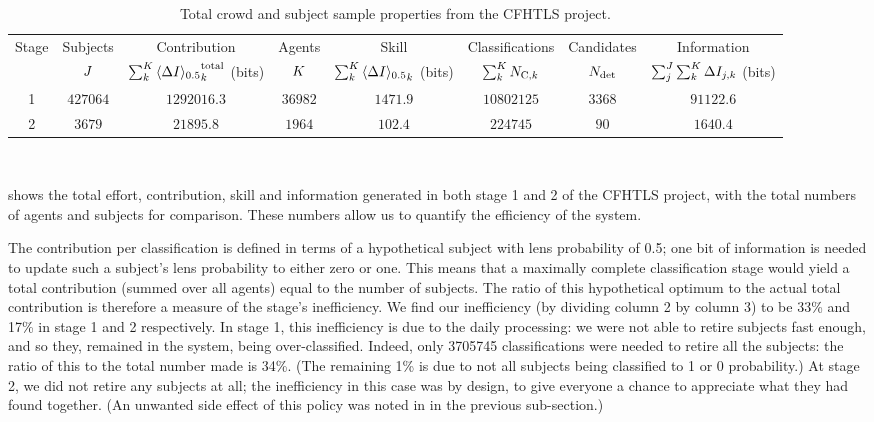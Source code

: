 \documentclass[useAMS,usenatbib,a4paper]{mn2e}
\begin{document}
\begin{table}
\begin{center}
\caption{Total crowd and subject sample properties from the CFHTLS project.}
\label{tab:crowd:contributions}
\begin{tabular}{cccccccc}
  \hline
  \hline {Stage} & Subjects & Contribution                          & Agents & Skill      & Classifications          & Candidates & Information \\
                 & $J$    & $\sum_k^{K} {\langle \Delta I \rangle_{0.5}}^{\rm total}_k$ (bits) & $K$  & $\sum_k^{K} {\langle \Delta I \rangle_{0.5}}_k$ (bits) & $\sum_k^{K} N_{{\rm C},k}$ & $N_{\rm det}$  & $\sum_j^{J}\sum_k^{K} \Delta I_{j,k}$ (bits) \\
  \hline 
            1    & $427064$ & $1292016.3$ & $36982$ & $1471.9$ & $10802125$ & $3368$ & $91122.6$ \\
            2    & $3679$   &   $21895.8$ &  $1964$ &  $102.4$ &   $224745$ &   $90$ &  $1640.4$ \\
  \hline \hline
\end{tabular}
\medskip\\
\end{center}
\end{table}

 shows the total effort, contribution, skill and
information generated in both stage 1 and 2 of the CFHTLS project, with the
total numbers of agents and subjects for comparison.   These numbers allow us
to quantify the efficiency of the system.  

The contribution per classification is defined in terms of a hypothetical
subject with lens probability of 0.5; one bit of information is needed to
update such a subject's lens probability to either zero or one. This means
that a maximally complete classification stage would yield a total
contribution (summed over all agents) equal to the number of subjects. The
ratio of this hypothetical optimum to the actual total contribution is
therefore a measure of the stage's inefficiency. We find our inefficiency (by
dividing column 2 by column 3) to be 33\% and 17\% in stage 1 and 2
respectively. In stage 1, this inefficiency is due to the daily processing: we
were not able to retire subjects fast enough, and so they, remained in the
system, being over-classified. Indeed, only 3705745 classifications were
needed to retire all the subjects: the ratio of this to the total number made
is 34\%. (The remaining 1\% is due to not all subjects being classified to 1
or 0 probability.) At stage 2, we did not retire any subjects at all; the
inefficiency in this case was by design, to give everyone a chance to
appreciate what they had found together. (An unwanted side effect of this
policy was noted in  in the
previous sub-section.)
\end{document}
